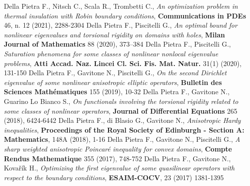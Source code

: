 \documentclass[11pt,a4paper,sans,colorlinks,linkcolor=green]{moderncv}
\begin{document}
 {Della Pietra F., Nitsch C., Scala R., Trombetti C., \textit{An optimization problem in thermal insulation with Robin boundary conditions}, \textbf{Communications in PDEs} 46, n. 12 (2021), 2288-2304}
 {Della Pietra F., Piscitelli G., \textit{An optimal bound for nonlinear eigenvalues and torsional rigidity on domains with holes}, \textbf{Milan Journal of Mathematics} 88 (2020), 373–384}
 {Della Pietra F., Piscitelli G., \textit{Saturation phenomena for some classes of nonlinear nonlocal eigenvalue problems}, \textbf{Atti Accad. Naz. Lincei Cl. Sci. Fis. Mat. Natur.} 31(1) (2020), 131-150}
 {Della Pietra F., Gavitone N., Piscitelli G.,
\textit{On the second Dirichlet eigenvalue of some nonlinear anisotropic elliptic operators},  \textbf{Bulletin des Sciences Math\'ematiques} 155 (2019), 10-32}
 {Della Pietra F., Gavitone N., Guarino Lo Bianco S., \textit{On functionals involving the torsional rigidity related to some classes of nonlinear operators},
\textbf{Journal of Differential Equations} 265 (2018), 6424-6442}
 {Della Pietra F., di Blasio G., Gavitone N., \textit{Anisotropic Hardy inequalities}, \textbf{Proceedings of the Royal Society of Edinburgh - Section A: Mathematics}, 148A (2018), 1-16}
 {Della Pietra F., Gavitone N., Piscitelli G., \textit{A sharp weighted anisotropic Poincar\'e inequality for convex domains}, \textbf{Compte Rendus Mathematique} 355 (2017), 748-752}
{Della Pietra F., Gavitone N., Kova\v{r}\'ik H.,
\textit{Optimizing the first eigenvalue of some quasilinear operators with respect to the boundary conditions}, \textbf{ESAIM-COCV}, 23 (2017) 1381-1395}
\end{document}
